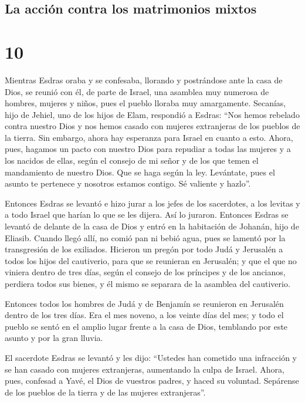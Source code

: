 \hypertarget{la-acciuxf3n-contra-los-matrimonios-mixtos}{%
\subsection{La acción contra los matrimonios
mixtos}\label{la-acciuxf3n-contra-los-matrimonios-mixtos}}

\hypertarget{section-9}{%
\section{10}\label{section-9}}

 Mientras Esdras oraba y se confesaba, llorando y
postrándose ante la casa de Dios, se reunió con él, de parte de Israel,
una asamblea muy numerosa de hombres, mujeres y niños, pues el pueblo
lloraba muy amargamente.  Secanías, hijo de Jehiel, uno de
los hijos de Elam, respondió a Esdras: ``Nos hemos rebelado contra
nuestro Dios y nos hemos casado con mujeres extranjeras de los pueblos
de la tierra. Sin embargo, ahora hay esperanza para Israel en cuanto a
esto.  Ahora, pues, hagamos un pacto con nuestro Dios para
repudiar a todas las mujeres y a los nacidos de ellas, según el consejo
de mi señor y de los que temen el mandamiento de nuestro Dios. Que se
haga según la ley.  Levántate, pues el asunto te pertenece
y nosotros estamos contigo. Sé valiente y hazlo''.

 Entonces Esdras se levantó e hizo jurar a los jefes de
los sacerdotes, a los levitas y a todo Israel que harían lo que se les
dijera. Así lo juraron.  Entonces Esdras se levantó de
delante de la casa de Dios y entró en la habitación de Johanán, hijo de
Eliasib. Cuando llegó allí, no comió pan ni bebió agua, pues se lamentó
por la transgresión de los exiliados.  Hicieron un pregón
por todo Judá y Jerusalén a todos los hijos del cautiverio, para que se
reunieran en Jerusalén;  y que el que no viniera dentro de
tres días, según el consejo de los príncipes y de los ancianos, perdiera
todos sus bienes, y él mismo se separara de la asamblea del cautiverio.

 Entonces todos los hombres de Judá y de Benjamín se
reunieron en Jerusalén dentro de los tres días. Era el mes noveno, a los
veinte días del mes; y todo el pueblo se sentó en el amplio lugar frente
a la casa de Dios, temblando por este asunto y por la gran lluvia.

 El sacerdote Esdras se levantó y les dijo: ``Ustedes han
cometido una infracción y se han casado con mujeres extranjeras,
aumentando la culpa de Israel.  Ahora, pues, confesad a
Yavé, el Dios de vuestros padres, y haced su voluntad. Sepárense de los
pueblos de la tierra y de las mujeres extranjeras''.

